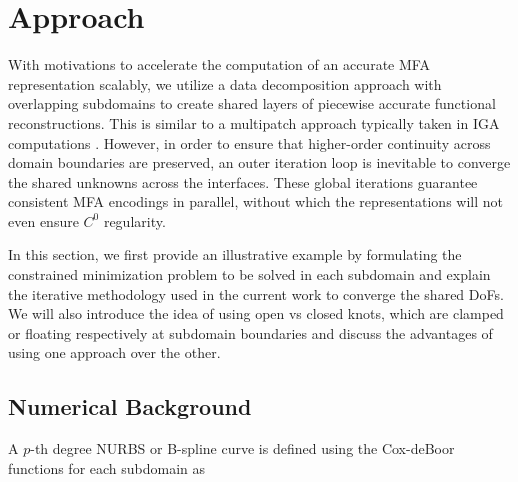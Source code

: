 
\section{Approach}
\label{sec:approach}

With motivations to accelerate the computation of an accurate MFA representation scalably, we utilize a data decomposition approach with overlapping subdomains to create shared layers of piecewise accurate functional reconstructions. This is similar to a multipatch approach typically taken in IGA computations \cite{cottrell2009, petiga-dalcin-2016}.  However, in order to ensure that higher-order continuity across domain boundaries are preserved, an outer iteration loop is inevitable to converge the shared unknowns across the interfaces. These global iterations guarantee consistent MFA encodings in parallel, without which the representations will not even ensure $C^0$ regularity. 

In this section, we first provide an illustrative example by formulating the constrained minimization problem to be solved in each subdomain and explain the iterative methodology used in the current work to converge the shared DoFs. We will also introduce the idea of using open vs closed knots, which are clamped or floating respectively at subdomain boundaries and discuss the advantages of using one approach over the other. %



\subsection{Numerical Background}
\label{sec:background}

A $p$-th degree NURBS or B-spline curve \cite{nurbs-book} is defined using the Cox-deBoor functions for each subdomain as

